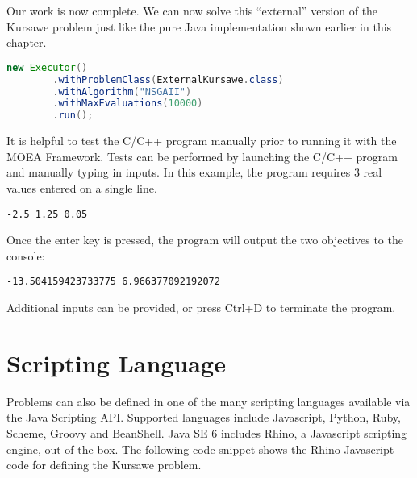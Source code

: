 Our work is now complete.  We can now solve this ``external'' version of the Kursawe problem just like the pure Java implementation shown earlier in this chapter.

\begin{lstlisting}[language=Java]
new Executor()
		.withProblemClass(ExternalKursawe.class)
		.withAlgorithm("NSGAII")
		.withMaxEvaluations(10000)
		.run();
\end{lstlisting}

\begin{tip}
It is helpful to test the C/C++ program manually prior to running it with the MOEA Framework.  Tests can be performed by launching the C/C++ program and manually typing in inputs.  In this example, the program requires 3 real values entered on a single line.
\end{tip}

\begin{lstlisting}[language=Plaintext]
-2.5 1.25 0.05
\end{lstlisting}

Once the enter key is pressed, the program will output the two objectives to the console:

\begin{lstlisting}[language=Plaintext]
-13.504159423733775 6.966377092192072
\end{lstlisting}

Additional inputs can be provided, or press Ctrl+D to terminate the program.

\section{Scripting Language}
Problems can also be defined in one of the many scripting languages available via the Java Scripting API.  Supported languages include Javascript, Python, Ruby, Scheme, Groovy and BeanShell.  Java SE 6 includes Rhino, a Javascript scripting engine, out-of-the-box.  The following code snippet shows the Rhino Javascript code for defining the Kursawe problem.

